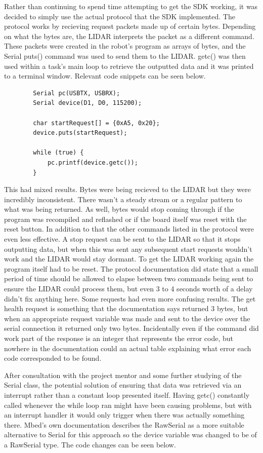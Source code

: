 		Rather than continuing to spend time attempting to get the SDK working, it was decided to simply use the actual protocol that the SDK implemented. The protocol works by recieving request packets made up of certain bytes. Depending on what the bytes are, the LIDAR interprets the packet as a different command. These packets were created in the robot's program as arrays of bytes, and the Serial puts() command was used to send them to the LIDAR. getc() was then used within a task's main loop to retrieve the outputted data and it was printed to a terminal window. Relevant code snippets can be seen below.
		\begin{lstlisting}
		Serial pc(USBTX, USBRX);
		Serial device(D1, D0, 115200);
		
		char startRequest[] = {0xA5, 0x20};
		device.puts(startRequest);
		
		while (true) {
			pc.printf(device.getc()); 
		}
		\end{lstlisting}
		This had mixed results. Bytes were being recieved to the LIDAR but they were incredibly inconsistent. There wasn't a steady stream or a regular pattern to what was being returned. As well, bytes would stop coming through if the program was recompiled and reflashed or if the board itself was reset with the reset button. In addition to that the other commands listed in the protocol were even less effective. A stop request can be sent to the LIDAR so that it stops outputting data, but when this was sent any subsequent start requests wouldn't work and the LIDAR would stay dormant. To get the LIDAR working again the program itself had to be reset. The protocol documentation did state that a small period of time should be allowed to elapse between two commands being sent to ensure the LIDAR could process them, but even 3 to 4 seconds worth of a delay didn't fix anything here. Some requests had even more confusing results. The get health request is something that the documentation says returned 3 bytes, but when an appropriate request variable was made and sent to the device over the serial connection it returned only two bytes. Incidentally even if the command did work part of the response is an integer that represents the error code, but nowhere in the documentation could an actual table explaining what error each code corresponded to be found. 
		
		After consultation with the project mentor and some further studying of the Serial class, the potential solution of ensuring that data was retrieved via an interrupt rather than a constant loop presented itself. Having getc() constantly called whenever the while loop ran might have been causing problems, but with an interrupt handler it would only trigger when there was actually something there. Mbed's own documentation describes the RawSerial as a more suitable alternative to Serial for this approach so the device variable was changed to be of a RawSerial type. The code changes can be seen below.
		
